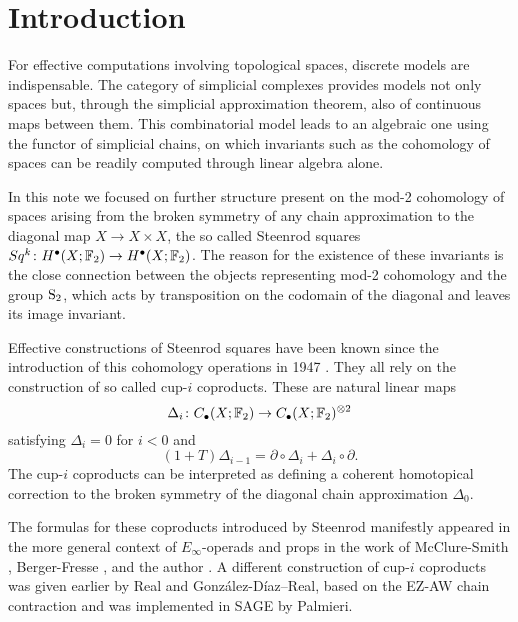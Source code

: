 
\section{Introduction}

For effective computations involving topological spaces, discrete models are indispensable.
The category of simplicial complexes provides models not only spaces but, through the simplicial approximation theorem, also of continuous maps between them.
This combinatorial model leads to an algebraic one using the functor of simplicial chains, on which invariants such as the cohomology of spaces can be readily computed through linear algebra alone.

In this note we focused on further structure present on the mod-2 cohomology of spaces arising from the broken symmetry of any chain approximation to the diagonal map $X \to X \times X$, the so called Steenrod squares $Sq^k \colon H^\bullet(X; \F_2) \to H^\bullet(X; \F_2)$.
The reason for the existence of these invariants is the close connection between the objects representing mod-2 cohomology and the group $\S_2$, which acts by transposition on the codomain of the diagonal and leaves its image invariant.

Effective constructions of Steenrod squares have been known since the introduction of this cohomology operations in 1947 \cite{steenrod47}.
They all rely on the construction of so called cup-$i$ coproducts.
These are natural linear maps
\begin{equation*}
\Delta_i \colon \chains(X; \F_2)  \to \chains(X; \F_2)^{\otimes 2}
\end{equation*}
satisfying $\Delta_i = 0$ for $i < 0$ and
\begin{equation*}
(1 + T) \Delta_{i-1} = \partial \circ \Delta_i + \Delta_i \circ \partial.
\end{equation*}
The cup-$i$ coproducts can be interpreted as defining a coherent homotopical correction to the broken symmetry of the diagonal chain approximation $\Delta_0$.

The formulas for these coproducts introduced by Steenrod manifestly appeared in the more general context of $E_\infty$-operads and props in the work of McClure-Smith \cite{mcclure03cochain}, Berger-Fresse \cite{berger04combinatorial}, and the author \cite{medina2020prop1,medina2018prop2}.
A different construction of cup-$i$ coproducts was given earlier by Real and Gonz\'alez-D\'iaz--Real, based on the EZ-AW chain contraction and was implemented in SAGE by Palmieri.

